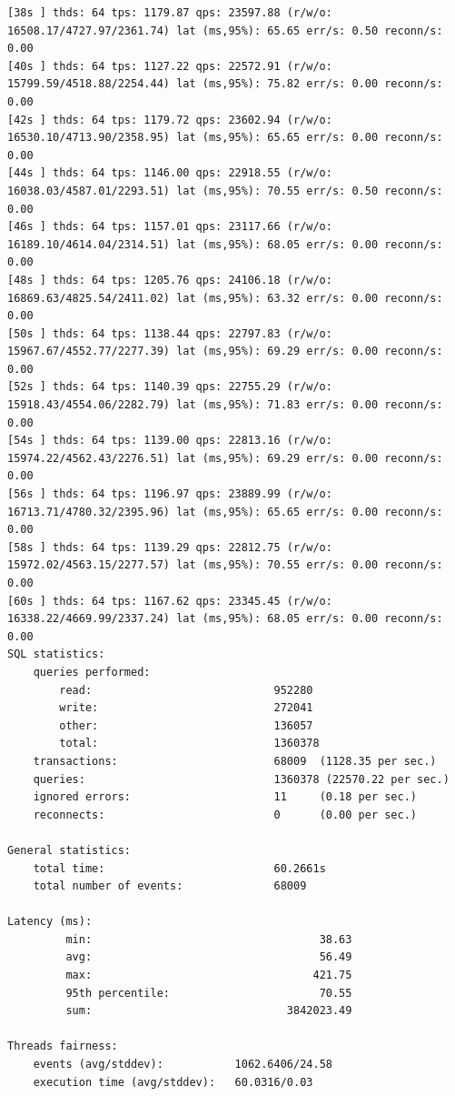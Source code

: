 \documentclass{article}
\begin{document}
\begin{verbatim}
[38s ] thds: 64 tps: 1179.87 qps: 23597.88 (r/w/o: 16508.17/4727.97/2361.74) lat (ms,95%): 65.65 err/s: 0.50 reconn/s: 0.00
[40s ] thds: 64 tps: 1127.22 qps: 22572.91 (r/w/o: 15799.59/4518.88/2254.44) lat (ms,95%): 75.82 err/s: 0.00 reconn/s: 0.00
[42s ] thds: 64 tps: 1179.72 qps: 23602.94 (r/w/o: 16530.10/4713.90/2358.95) lat (ms,95%): 65.65 err/s: 0.00 reconn/s: 0.00
[44s ] thds: 64 tps: 1146.00 qps: 22918.55 (r/w/o: 16038.03/4587.01/2293.51) lat (ms,95%): 70.55 err/s: 0.50 reconn/s: 0.00
[46s ] thds: 64 tps: 1157.01 qps: 23117.66 (r/w/o: 16189.10/4614.04/2314.51) lat (ms,95%): 68.05 err/s: 0.00 reconn/s: 0.00
[48s ] thds: 64 tps: 1205.76 qps: 24106.18 (r/w/o: 16869.63/4825.54/2411.02) lat (ms,95%): 63.32 err/s: 0.00 reconn/s: 0.00
[50s ] thds: 64 tps: 1138.44 qps: 22797.83 (r/w/o: 15967.67/4552.77/2277.39) lat (ms,95%): 69.29 err/s: 0.00 reconn/s: 0.00
[52s ] thds: 64 tps: 1140.39 qps: 22755.29 (r/w/o: 15918.43/4554.06/2282.79) lat (ms,95%): 71.83 err/s: 0.00 reconn/s: 0.00
[54s ] thds: 64 tps: 1139.00 qps: 22813.16 (r/w/o: 15974.22/4562.43/2276.51) lat (ms,95%): 69.29 err/s: 0.00 reconn/s: 0.00
[56s ] thds: 64 tps: 1196.97 qps: 23889.99 (r/w/o: 16713.71/4780.32/2395.96) lat (ms,95%): 65.65 err/s: 0.00 reconn/s: 0.00
[58s ] thds: 64 tps: 1139.29 qps: 22812.75 (r/w/o: 15972.02/4563.15/2277.57) lat (ms,95%): 70.55 err/s: 0.00 reconn/s: 0.00
[60s ] thds: 64 tps: 1167.62 qps: 23345.45 (r/w/o: 16338.22/4669.99/2337.24) lat (ms,95%): 68.05 err/s: 0.00 reconn/s: 0.00
SQL statistics:
    queries performed:
        read:                            952280
        write:                           272041
        other:                           136057
        total:                           1360378
    transactions:                        68009  (1128.35 per sec.)
    queries:                             1360378 (22570.22 per sec.)
    ignored errors:                      11     (0.18 per sec.)
    reconnects:                          0      (0.00 per sec.)

General statistics:
    total time:                          60.2661s
    total number of events:              68009

Latency (ms):
         min:                                   38.63
         avg:                                   56.49
         max:                                  421.75
         95th percentile:                       70.55
         sum:                              3842023.49

Threads fairness:
    events (avg/stddev):           1062.6406/24.58
    execution time (avg/stddev):   60.0316/0.03
\end{verbatim}
\end{document}
